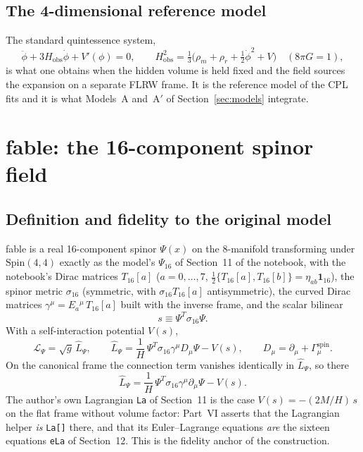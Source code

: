 \documentclass[11pt,a4paper]{article}
\newcommand{\fable}{\textsf{fable}}
\newcommand{\Lhat}{\hat{L}}
\newcommand{\sig}{\sigma_{16}}
\newcommand{\T}[1]{T_{16}[#1]}
\newcommand{\sgn}{\sqrt{g}}
\newcommand{\Hobs}{H_{\mathrm{obs}}}
\begin{document}
\subsection{The 4-dimensional reference model}

The standard quintessence system,
\begin{equation}\label{eq:KG}
  \ddot\phi+3\Hobs\dot\phi+V'(\phi)=0,\qquad
  \Hobs^2=\tfrac13\bigl(\rho_m+\rho_r+\tfrac12\dot\phi^2+V\bigr)\quad(8\pi G=1),
\end{equation}
is what one obtains when the hidden volume is held fixed and the field sources the expansion on
a separate FLRW frame. It is the reference model of the CPL fits and it is what Models~A and~A$'$
of Section~\ref{sec:models} integrate.

\section{\fable: the 16-component spinor field}\label{sec:spinor}

\subsection{Definition and fidelity to the original model}

\fable{} is a real 16-component spinor $\Psi(x)$ on the 8-manifold transforming under
$\mathrm{Spin}(4,4)$ exactly as the model's $\Psi_{16}$ of Section~11 of the notebook, with the
notebook's Dirac matrices $\T{a}$ ($a=0,\dots,7$, $\tfrac12\{\T{a},\T{b}\}=\eta_{ab}\mathbf{1}_{16}$),
the spinor metric $\sig$ (symmetric, with $\sig\T{a}$ antisymmetric), the curved Dirac matrices
$\gamma^\mu=E_a{}^\mu\,\T{a}$ built with the inverse frame, and the scalar bilinear
\begin{equation}\label{eq:s}
  s\equiv\Psi^{T}\sig\Psi .
\end{equation}
With a self-interaction potential $V(s)$,
\begin{equation}\label{eq:Lpsi}
  \mathcal{L}_\Psi=\sgn\,\Lhat_\Psi,\qquad
  \Lhat_\Psi=\frac1H\,\Psi^{T}\sig\gamma^\mu D_\mu\Psi-V(s),\qquad
  D_\mu=\partial_\mu+\Gamma^{\mathrm{spin}}_\mu .
\end{equation}
On the canonical frame the connection term vanishes identically in $\Lhat_\Psi$, so there
\begin{equation}\label{eq:Lpsiflat}
  \Lhat_\Psi=\frac1H\,\Psi^{T}\sig\gamma^\mu\partial_\mu\Psi-V(s).
\end{equation}
The author's own Lagrangian
\texttt{La} of Section~11 is the case $V(s)=-(2M/H)\,s$ on the flat frame without volume factor:
Part~VI asserts that the Lagrangian helper \emph{is} \texttt{La[]} there, and that its
Euler--Lagrange equations \emph{are} the sixteen equations \texttt{eLa} of Section~12. This is the
fidelity anchor of the construction.
\end{document}
